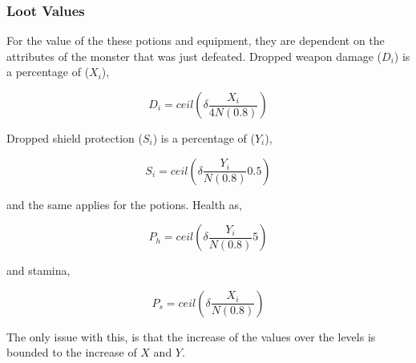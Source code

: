 
\subsubsection{Loot Values}

For the value of the these potions and equipment, they are dependent on the attributes of the monster that was just defeated. Dropped weapon damage ($D_i$) is a percentage of ($X_i$),

\begin{equation}
    D_i = ceil\left (\delta \frac{X_i}{4N(0.8)} \right)
\end{equation}

\noindent Dropped shield protection ($S_i$) is a percentage of ($Y_i$),

\begin{equation}
    S_i = ceil \left( \delta \frac{Y_i}{N(0.8)}0.5 \right)
\end{equation}

and the same applies for the potions. Health as,

\begin{equation}
    P_h = ceil \left( \delta \frac{Y_i}{N(0.8)}5 \right)
\end{equation}

and stamina,

\begin{equation}
    P_s = ceil \left( \delta \frac{X_i}{N(0.8)} \right)
\end{equation}

\noindent The only issue with this, is that the increase of the values over the levels is bounded to the increase of $X$ and $Y$.

